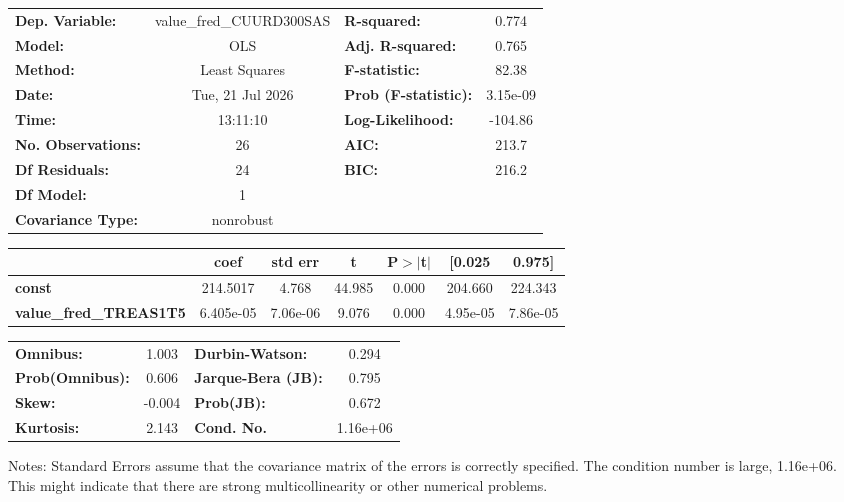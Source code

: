 \begin{center}
\begin{tabular}{lclc}
\toprule
\textbf{Dep. Variable:}        & value\_fred\_CUURD300SAS & \textbf{  R-squared:         } &     0.774   \\
\textbf{Model:}                &           OLS            & \textbf{  Adj. R-squared:    } &     0.765   \\
\textbf{Method:}               &      Least Squares       & \textbf{  F-statistic:       } &     82.38   \\
\textbf{Date:}                 &     Tue, 21 Jul 2026     & \textbf{  Prob (F-statistic):} &  3.15e-09   \\
\textbf{Time:}                 &         13:11:10         & \textbf{  Log-Likelihood:    } &   -104.86   \\
\textbf{No. Observations:}     &              26          & \textbf{  AIC:               } &     213.7   \\
\textbf{Df Residuals:}         &              24          & \textbf{  BIC:               } &     216.2   \\
\textbf{Df Model:}             &               1          & \textbf{                     } &             \\
\textbf{Covariance Type:}      &        nonrobust         & \textbf{                     } &             \\
\bottomrule
\end{tabular}
\begin{tabular}{lcccccc}
                               & \textbf{coef} & \textbf{std err} & \textbf{t} & \textbf{P$> |$t$|$} & \textbf{[0.025} & \textbf{0.975]}  \\
\midrule
\textbf{const}                 &     214.5017  &        4.768     &    44.985  &         0.000        &      204.660    &      224.343     \\
\textbf{value\_fred\_TREAS1T5} &    6.405e-05  &     7.06e-06     &     9.076  &         0.000        &     4.95e-05    &     7.86e-05     \\
\bottomrule
\end{tabular}
\begin{tabular}{lclc}
\textbf{Omnibus:}       &  1.003 & \textbf{  Durbin-Watson:     } &    0.294  \\
\textbf{Prob(Omnibus):} &  0.606 & \textbf{  Jarque-Bera (JB):  } &    0.795  \\
\textbf{Skew:}          & -0.004 & \textbf{  Prob(JB):          } &    0.672  \\
\textbf{Kurtosis:}      &  2.143 & \textbf{  Cond. No.          } & 1.16e+06  \\
\bottomrule
\end{tabular}
\end{center}

Notes: \newline
 [1] Standard Errors assume that the covariance matrix of the errors is correctly specified. \newline
 [2] The condition number is large, 1.16e+06. This might indicate that there are \newline
 strong multicollinearity or other numerical problems.